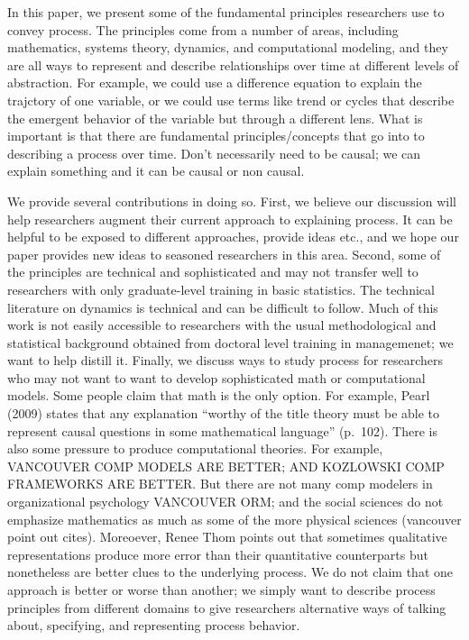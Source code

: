 \documentclass[english,,man]{apa6}
\theoremstyle{definition}
\theoremstyle{definition}
\theoremstyle{definition}
\theoremstyle{remark}
\begin{document}
In this paper, we present some of the fundamental principles researchers
use to convey process. The principles come from a number of areas,
including mathematics, systems theory, dynamics, and computational
modeling, and they are all ways to represent and describe relationships
over time at different levels of abstraction. For example, we could use
a difference equation to explain the trajctory of one variable, or we
could use terms like trend or cycles that describe the emergent behavior
of the variable but through a different lens. What is important is that
there are fundamental principles/concepts that go into to describing a
process over time. Don't necessarily need to be causal; we can explain
something and it can be causal or non causal.

We provide several contributions in doing so. First, we believe our
discussion will help researchers augment their current approach to
explaining process. It can be helpful to be exposed to different
approaches, provide ideas etc., and we hope our paper provides new ideas
to seasoned researchers in this area. Second, some of the principles are
technical and sophisticated and may not transfer well to researchers
with only graduate-level training in basic statistics. The technical
literature on dynamics is technical and can be difficult to follow. Much
of this work is not easily accessible to researchers with the usual
methodological and statistical background obtained from doctoral level
training in managemenet; we want to help distill it. Finally, we discuss
ways to study process for researchers who may not want to want to
develop sophisticated math or computational models. Some people claim
that math is the only option. For example, Pearl (2009) states that any
explanation \enquote{worthy of the title theory must be able to
represent causal questions in some mathematical language} (p.~102).
There is also some pressure to produce computational theories. For
example, VANCOUVER COMP MODELS ARE BETTER; AND KOZLOWSKI COMP FRAMEWORKS
ARE BETTER. But there are not many comp modelers in organizational
psychology VANCOUVER ORM; and the social sciences do not emphasize
mathematics as much as some of the more physical sciences (vancouver
point out cites). Moreoever, Renee Thom points out that sometimes
qualitative representations produce more error than their quantitative
counterparts but nonetheless are better clues to the underlying process.
We do not claim that one approach is better or worse than another; we
simply want to describe process principles from different domains to
give researchers alternative ways of talking about, specifying, and
representing process behavior.
\end{document}
